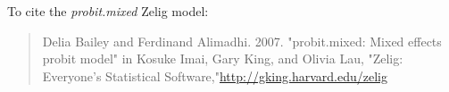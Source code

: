 To cite the \emph{ probit.mixed } Zelig model:
 \begin{verse}
 Delia Bailey and Ferdinand Alimadhi. 2007. "probit.mixed: Mixed effects probit model" in Kosuke Imai, Gary King, and Olivia Lau, "Zelig: Everyone's Statistical Software,"\url{http://gking.harvard.edu/zelig} 
\end{verse}